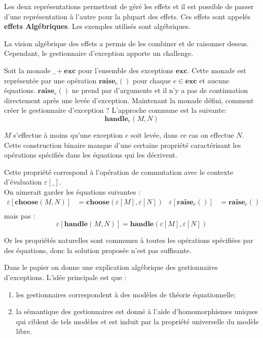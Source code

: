 	Les deux représentations permettent de géré les effets et il est possible de passer d'une représentation à l'autre pour la plupart des effets. Ces effets sont appelés \textbf{effets Algébriques}. Les exemples utilisés sont algébriques.
	\medbreak
	
	La vision algébrique des effets a permis de les combiner et de raisonner dessus. Cependant, le gestionnaire d'exception apporte un challenge.
	\smallbreak
	
	Soit la monade $\_ + \textbf{exc}$ pour l'ensemble des exceptions $\textbf{exc}$. Cette monade est représentée par une opération $\textbf{raise}_e()$ pour chaque $e \in \textbf{exc}$ et aucune équations. $\textbf{raise}_e()$ ne prend par d'arguments et il n'y a pas de continuation directement après une levée d'exception. Maintenant la monade défini, comment créer le gestionnaire d'exception ? L'approche commune est la suivante:
	\[\textbf{handle}_e(M,N)\]
		
	$M$ s'effectue à moins qu'une exception $e$ soit levée, dans ce cas on effectue $N$. Cette construction binaire manque d'une certaine propriété caractérisant les opérations spécifiés dans les équations qui les décrivent.
	
	\begin{exemple}\label{exEval}
		Cette propriété correspond à l'opération de commutation avec le contexte d'évaluation $\varepsilon[\_]$.\\
		On aimerait garder les équations suivantes : 
		\begin{align*}
			\varepsilon[\textbf{choose}(M,N)] &= \textbf{choose}(\varepsilon[M],\varepsilon[N]) & \varepsilon[\textbf{raise}_e()] &= \textbf{raise}_e()\\
		\end{align*}
		mais pas : 
		\[\varepsilon[\textbf{handle}(M,N)] = \textbf{handle}(\varepsilon[M],\varepsilon[N])\]
	
		Or les propriétés naturelles sont communes à toutes les opérations spécifiées par des équations, donc la solution proposée n'est pas suffisante.
	\end{exemple} 

	Dans le papier on donne une explication algébrique des gestionnaires d'exceptions. L'idée principale est que :
	\begin{enumerate}
		\item les gestionnaires correspondent à des modèles de théorie équationnelle;
		\item la sémantique des gestionnaires est donné à l'aide d'homomorphismes uniques qui ciblent de tels modèles et est induit par la propriété universelle du modèle libre. 
	\end{enumerate}

